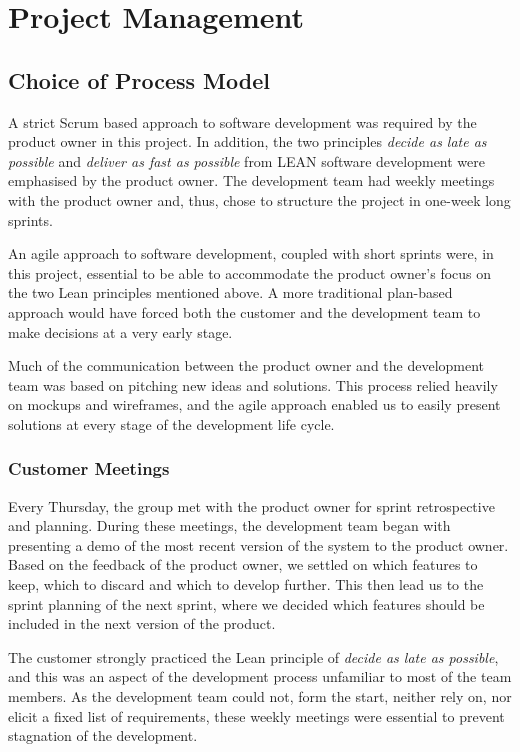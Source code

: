 \chapter{Project Management}


\section{Choice of Process Model}
A strict Scrum based approach to software development was required by the product owner in this project. In addition, the two principles \textit{decide as late as possible} and \textit{deliver as fast as possible}  from  LEAN software development were emphasised by the product owner. The development team had weekly meetings with the product owner and, thus, chose to structure the project in one-week long sprints. 

An agile approach to software development, coupled with short sprints were, in this project, essential to be able to accommodate the product owner's focus on the two Lean principles mentioned above. A more traditional plan-based approach would have forced both the customer and the development team to make decisions at a very early stage. 

Much of the communication between the product owner and the development team was based on pitching new ideas and solutions. This process relied heavily on mockups and wireframes, and the agile approach enabled us to easily present solutions at every stage of the development life cycle.


\subsection{Customer Meetings}
Every Thursday, the group met with the product owner for sprint retrospective and planning. During these meetings, the development team began with presenting a demo of the most recent version of the system to the product owner. Based on the feedback of the product owner, we settled on which features to keep, which to discard and which to develop further. This then lead us to the sprint planning of the next sprint, where we decided which features should be included in the next version of the product. 

The customer strongly practiced the Lean principle of \textit{decide as late as possible}, and this was an aspect of the development process unfamiliar to most of the team members. As the development team could not, form the start, neither rely on, nor elicit a fixed list of requirements, these weekly meetings were essential to prevent stagnation of the development. 

